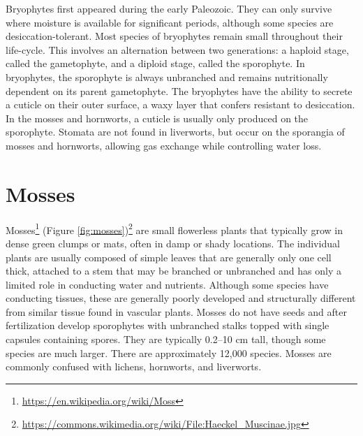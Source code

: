 \documentclass[]{book}
\let\rmarkdownfootnote\footnote%
\def\footnote{\protect\rmarkdownfootnote}
\renewcommand{\href}[2]{#2\footnote{\url{#1}}}
\begin{document}
Bryophytes first appeared during the early Paleozoic. They can only survive where moisture is available for significant periods, although some species are desiccation-tolerant. Most species of bryophytes remain small throughout their life-cycle. This involves an alternation between two generations: a haploid stage, called the gametophyte, and a diploid stage, called the sporophyte. In bryophytes, the sporophyte is always unbranched and remains nutritionally dependent on its parent gametophyte. The bryophytes have the ability to secrete a cuticle on their outer surface, a waxy layer that confers resistant to desiccation. In the mosses and hornworts, a cuticle is usually only produced on the sporophyte. Stomata are not found in liverworts, but occur on the sporangia of mosses and hornworts, allowing gas exchange while controlling water loss.

\hypertarget{mosses}{%
\section{Mosses}\label{mosses}}

\href{https://en.wikipedia.org/wiki/Moss}{Mosses} \href{https://commons.wikimedia.org/wiki/File:Haeckel_Muscinae.jpg}{(Figure \ref{fig:mosses})} are small flowerless plants that typically grow in dense green clumps or mats, often in damp or shady locations. The individual plants are usually composed of simple leaves that are generally only one cell thick, attached to a stem that may be branched or unbranched and has only a limited role in conducting water and nutrients. Although some species have conducting tissues, these are generally poorly developed and structurally different from similar tissue found in vascular plants. Mosses do not have seeds and after fertilization develop sporophytes with unbranched stalks topped with single capsules containing spores. They are typically 0.2--10 cm tall, though some species are much larger. There are approximately 12,000 species. Mosses are commonly confused with lichens, hornworts, and liverworts.
\end{document}

